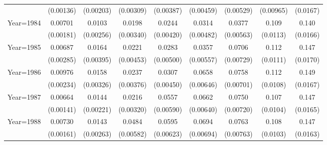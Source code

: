 \begin{table}[htbp]
\begin{tabular}{l*{8}{c}}
                    &   (0.00136)         &   (0.00203)         &   (0.00309)         &   (0.00387)         &   (0.00459)         &   (0.00529)         &   (0.00965)         &    (0.0167)         \\
[1em]
Year=1984           &     0.00701\sym{***}&      0.0103\sym{***}&      0.0198\sym{***}&      0.0244\sym{***}&      0.0314\sym{***}&      0.0377\sym{***}&       0.109\sym{***}&       0.140\sym{***}\\
                    &   (0.00181)         &   (0.00256)         &   (0.00340)         &   (0.00420)         &   (0.00482)         &   (0.00563)         &    (0.0113)         &    (0.0166)         \\
[1em]
Year=1985           &     0.00687\sym{**} &      0.0164\sym{***}&      0.0221\sym{***}&      0.0283\sym{***}&      0.0357\sym{***}&      0.0706\sym{***}&       0.112\sym{***}&       0.147\sym{***}\\
                    &   (0.00285)         &   (0.00395)         &   (0.00453)         &   (0.00500)         &   (0.00557)         &   (0.00729)         &    (0.0111)         &    (0.0170)         \\
[1em]
Year=1986           &     0.00976\sym{***}&      0.0158\sym{***}&      0.0237\sym{***}&      0.0307\sym{***}&      0.0658\sym{***}&      0.0758\sym{***}&       0.112\sym{***}&       0.149\sym{***}\\
                    &   (0.00234)         &   (0.00326)         &   (0.00376)         &   (0.00450)         &   (0.00646)         &   (0.00701)         &    (0.0108)         &    (0.0167)         \\
[1em]
Year=1987           &     0.00664\sym{***}&      0.0144\sym{***}&      0.0216\sym{***}&      0.0557\sym{***}&      0.0662\sym{***}&      0.0750\sym{***}&       0.107\sym{***}&       0.147\sym{***}\\
                    &   (0.00141)         &   (0.00221)         &   (0.00320)         &   (0.00590)         &   (0.00640)         &   (0.00720)         &    (0.0104)         &    (0.0165)         \\
[1em]
Year=1988           &     0.00730\sym{***}&      0.0143\sym{***}&      0.0484\sym{***}&      0.0595\sym{***}&      0.0694\sym{***}&      0.0763\sym{***}&       0.108\sym{***}&       0.147\sym{***}\\
                    &   (0.00161)         &   (0.00263)         &   (0.00582)         &   (0.00623)         &   (0.00694)         &   (0.00763)         &    (0.0103)         &    (0.0163)         \\

\end{tabular}
\end{table}
